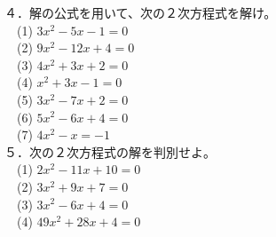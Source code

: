 \documentclass[a4paper,landscape,10pt,fleqn]{jsarticle}
\begin{document}
４．解の公式を用いて、次の２次方程式を解け。\vspace{2mm}\\
　(1) $3x^2-5x-1=0$
\vspace{3mm}\\
　(2) $9x^2-12x+4=0$
\vspace{3mm}\\
　(3) $4x^2+3x+2=0$
\vspace{3mm}\\
　(4) $x^2+3x-1=0$
\vspace{3mm}\\
　(5) $3x^2-7x+2=0$
\vspace{3mm}\\
　(6) $5x^2-6x+4=0$
\vspace{3mm}\\
　(7) $4x^2-x=-1$
\vspace{6mm}\\

５．次の２次方程式の解を判別せよ。\vspace{2mm}\\
　(1) $2x^2-11x+10=0$
\vspace{3mm}\\
　(2) $3x^2+9x+7=0$
\vspace{3mm}\\
　(3) $3x^2-6x+4=0$
\vspace{3mm}\\
　(4) $49x^2+28x+4=0$
\vspace{3mm}\\
\end{document}

